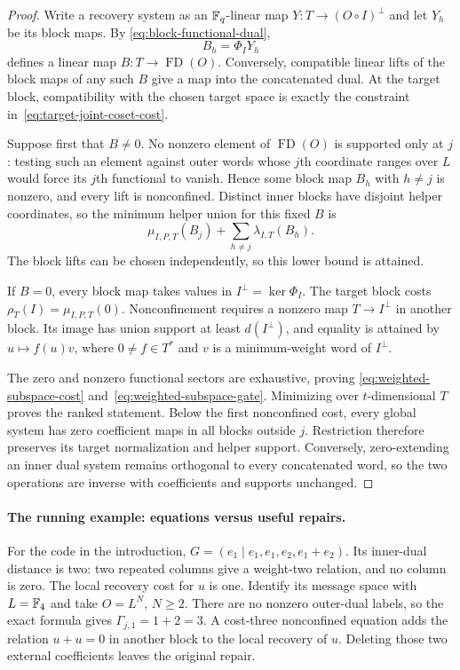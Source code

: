 \begin{proof}
Write a recovery system as an $\mathbb F_q$-linear map
$Y:T\to(O\circ I)^\perp$ and let $Y_h$ be its block maps.  By
\eqref{eq:block-functional-dual},
\[
 B_h=\Phi_IY_h
\]
defines a linear map $B:T\to\operatorname{FD}(O)$.  Conversely, compatible
linear lifts of the block maps of any such $B$ give a map into the
concatenated dual.  At the target block, compatibility with the chosen target
space is exactly the constraint in~\eqref{eq:target-joint-coset-cost}.

Suppose first that $B\ne0$.  No nonzero element of
$\operatorname{FD}(O)$ is supported only at $j$: testing such an element
against outer words whose $j$th coordinate ranges over $L$ would force its
$j$th functional to vanish.  Hence some block map $B_h$ with $h\ne j$ is
nonzero, and every lift is nonconfined.  Distinct inner blocks have disjoint
helper coordinates, so the minimum helper union for this fixed $B$ is
\[
 \mu_{I,P,T}(B_j)+
 \sum_{h\ne j}\lambda_{I,T}(B_h).
\]
The block lifts can be chosen independently, so this lower bound is attained.

If $B=0$, every block map takes values in $I^\perp=\ker\Phi_I$.  The target
block costs $\rho_T(I)=\mu_{I,P,T}(0)$.  Nonconfinement requires a nonzero map
$T\to I^\perp$ in another block.  Its image has union support at least
$d(I^\perp)$, and equality is attained by $u\mapsto f(u)v$, where
$0\ne f\in T^*$ and $v$ is a minimum-weight word of $I^\perp$.

The zero and nonzero functional sectors are exhaustive, proving
\eqref{eq:weighted-subspace-cost} and~\eqref{eq:weighted-subspace-gate}.
Minimizing over $t$-dimensional $T$ proves the ranked statement.  Below the
first nonconfined cost, every global system has zero coefficient maps in all
blocks outside $j$.  Restriction therefore preserves its target normalization
and helper support.  Conversely, zero-extending an inner dual system remains
orthogonal to every concatenated word, so the two operations are inverse with
coefficients and supports unchanged.
%
\end{proof}

\paragraph{The running example: equations versus useful repairs.}
For the code in the introduction,
$G=(e_1\mid e_1,e_1,e_2,e_1+e_2)$.
Its inner-dual distance is two: two repeated columns give a weight-two
relation, and no column is zero.  The local recovery cost for $u$ is one.
Identify its message space with $L=\mathbb F_4$ and take $O=L^N$, $N\geq2$.
There are no nonzero outer-dual labels, so the exact formula gives
$\Gamma_{j,1}=1+2=3$.  A cost-three nonconfined equation adds the relation
$u+u=0$ in another block to the local recovery of $u$.
Deleting those two external coefficients leaves the original repair.

